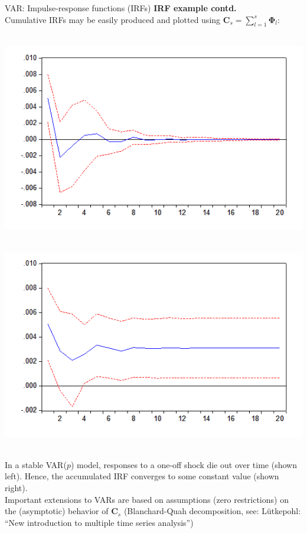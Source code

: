 \documentclass[usenames,dvipsnames]{beamer}
\begin{document}
\begin{frame}{VAR: Impulse-response functions (IRFs)}
\small 
\textbf{IRF example contd.}\\
Cumulative IRFs may be easily produced and plotted using $\bm{C}_s = \sum_{l=1}^s \bm{\Phi}_l$: \\
\medskip
\begin{minipage}[t]{.45\textwidth}
 \\
\includegraphics[width=\textwidth]{./img/P10_Obrazek_4}
\end{minipage}
\begin{minipage}[t]{.45\textwidth}
 \\
\includegraphics[width=1.04\textwidth]{./img/P10_Obrazek_5}
\end{minipage}\\
\medskip
In a stable VAR($p$) model, responses to a one-off shock die out over time (shown left). Hence, the accumulated IRF converges to some constant value (shown right). \\
\medskip
{\footnotesize
Important extensions to VARs are based on assumptions (zero restrictions) on the (asymptotic) behavior of $\bm{C}_s$ (Blanchard-Quah decomposition, see: Lütkepohl: ``New introduction to multiple time series analysis'')}
\end{frame}
\end{document}
